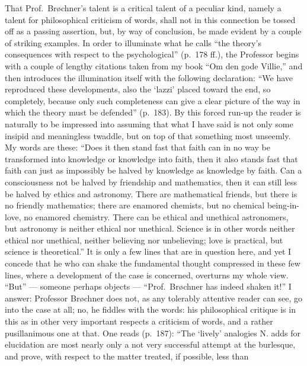 \documentclass[12pt]{book}
\newcommand{\opage}[1]{\marginnote{\footnotesize\textit{[#1]}}}
\begin{document}
That Prof.\ Brøchner's talent is a critical talent of a peculiar kind,
namely a talent for philosophical criticism of words, shall not in this
connection be tossed off as a passing assertion, but, by way of conclusion,
be made evident by a couple of striking examples. In order to illuminate
what he calls ``the theory's consequences with respect to the
psychological'' (p.\ 178 ff.), the Professor begins with a couple of lengthy
citations taken from my book ``Om den gode Villie,'' and then introduces the
illumination itself with
\opage{49}\setcounter{footnote}{0}%
the following declaration: ``We have reproduced these developments, also
the `lazzi' placed toward the end, so completely, because only such
completeness can give a clear picture of the way in which the theory must be
defended'' (p.\ 183). By this forced run-up the reader is naturally to be
impressed into assuming that what I have said is not only some insipid and
meaningless twaddle, but on top of that something most unseemly. My words
are these: ``Does it then stand fast that faith can in no way be
transformed into knowledge or knowledge into faith, then it also stands fast
that faith can just as impossibly be halved by knowledge as knowledge by
faith. Can a consciousness not be halved by friendship and mathematics, then
it can still less be halved by ethics and astronomy. There are mathematical
friends, but there is no friendly mathematics; there are enamored chemists,
but no chemical being-in-love, no enamored chemistry. There can be ethical
and unethical astronomers, but astronomy is neither ethical nor unethical.
Science is in other words neither ethical nor unethical, neither believing
nor unbelieving; love is practical, but science is theoretical.'' It is only
a few lines that are in question here, and yet I concede that he who can
shake the fundamental thought compressed in these few lines, where a
development of the case is concerned, overturns my whole view. ``But'' ---
someone perhaps objects --- ``Prof.\ Brøchner has indeed shaken it!'' I
answer: Professor Brøchner does not, as any tolerably attentive reader can
see, go into the case at all; no, he fiddles with the words: his
philosophical critique is in this as in other very important respects a
criticism of words, and a rather pusillanimous one at that. One reads
(p.\ 187): ``The `lively' analogies N. adds for elucidation are most nearly
only a not very successful attempt at the burlesque, and prove,
\opage{50}\setcounter{footnote}{0}%
with respect to the matter treated, if possible, less than
\end{document}
